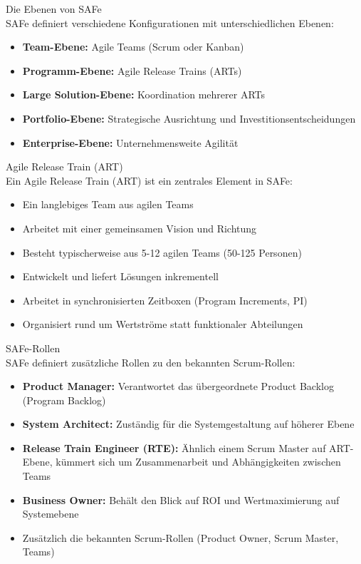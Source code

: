 \begin{concept}{Die Ebenen von SAFe}\\
    SAFe definiert verschiedene Konfigurationen mit unterschiedlichen Ebenen:
    \begin{itemize}
        \item \textbf{Team-Ebene:} Agile Teams (Scrum oder Kanban)
        \item \textbf{Programm-Ebene:} Agile Release Trains (ARTs)
        \item \textbf{Large Solution-Ebene:} Koordination mehrerer ARTs
        \item \textbf{Portfolio-Ebene:} Strategische Ausrichtung und Investitionsentscheidungen
        \item \textbf{Enterprise-Ebene:} Unternehmensweite Agilität
    \end{itemize}
\end{concept}

\begin{definition}{Agile Release Train (ART)}\\
    Ein Agile Release Train (ART) ist ein zentrales Element in SAFe:
    \begin{itemize}
        \item Ein langlebiges Team aus agilen Teams
        \item Arbeitet mit einer gemeinsamen Vision und Richtung
        \item Besteht typischerweise aus 5-12 agilen Teams (50-125 Personen)
        \item Entwickelt und liefert Lösungen inkrementell
        \item Arbeitet in synchronisierten Zeitboxen (Program Increments, PI)
        \item Organisiert rund um Wertströme statt funktionaler Abteilungen
    \end{itemize}
\end{definition}

\begin{concept}{SAFe-Rollen}\\
    SAFe definiert zusätzliche Rollen zu den bekannten Scrum-Rollen:
    \begin{itemize}
        \item \textbf{Product Manager:} Verantwortet das übergeordnete Product Backlog (Program Backlog)
        \item \textbf{System Architect:} Zuständig für die Systemgestaltung auf höherer Ebene
        \item \textbf{Release Train Engineer (RTE):} Ähnlich einem Scrum Master auf ART-Ebene, kümmert sich um Zusammenarbeit und Abhängigkeiten zwischen Teams
        \item \textbf{Business Owner:} Behält den Blick auf ROI und Wertmaximierung auf Systemebene
        \item Zusätzlich die bekannten Scrum-Rollen (Product Owner, Scrum Master, Teams)
    \end{itemize}
\end{concept}

